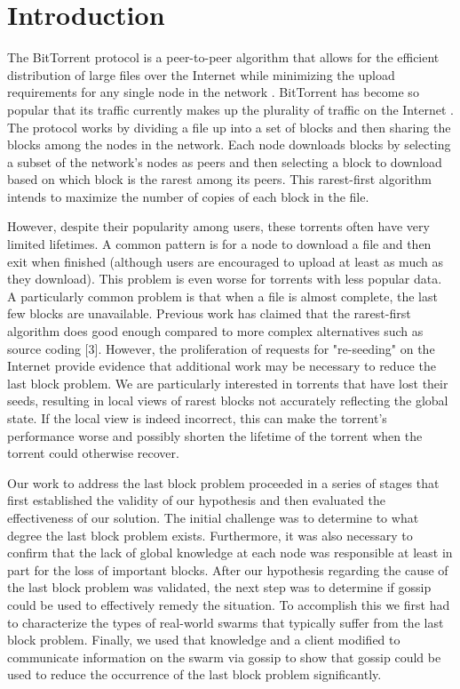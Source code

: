 \section{Introduction}

The BitTorrent protocol is a peer-to-peer algorithm that allows for the
efficient distribution of large files over the Internet while minimizing
the upload requirements for any single node in the network \cite{bep003}. BitTorrent
has become so popular that its traffic currently makes up the plurality
of traffic on the Internet \cite{istudy08}. The protocol works by dividing a file
up into a set of blocks and then sharing the blocks among the nodes in
the network. Each node downloads blocks by selecting a subset of the
network's nodes as peers and then selecting a block to download based on
which block is the rarest among its peers. This rarest-first algorithm
intends to maximize the number of copies of each block in the file.


However, despite their popularity among users, these torrents
often have very limited lifetimes. A common pattern is for a node
to download a file and then exit when finished (although users are
encouraged to upload at least as much as they download). This problem
is even worse for torrents with less popular data. A particularly
common problem is that when a file is almost complete, the last
few blocks are unavailable. Previous work has claimed that the
rarest-first algorithm does good enough compared to more complex
alternatives such as source coding [3]. However, the proliferation
of requests for "re-seeding" on the Internet provide evidence that
additional work may be necessary to reduce the last block problem. We
are particularly interested in torrents that have lost their seeds,
resulting in local views of rarest blocks not accurately reflecting
the global state. If the local view is indeed incorrect, this can
make the torrent's performance worse and possibly shorten the lifetime
of the torrent when the torrent could otherwise recover.


Our work to address the last block problem proceeded in a series of stages
that first established the validity of our hypothesis and then evaluated
the effectiveness of our solution. The initial challenge was to determine
to what degree the last block problem exists. Furthermore,  it was also
necessary to confirm that the lack of global knowledge at each node was
responsible at least in part for the loss of important blocks. After our
hypothesis regarding the cause of the last block problem was validated,
the next step was to determine if gossip could be used to effectively
remedy the situation. To accomplish this we first had to characterize
the types of real-world swarms that typically suffer from the last
block problem. Finally, we used that knowledge and a client modified to
communicate information on the swarm via gossip to show that gossip could
be used to reduce the occurrence of the last block problem significantly.


